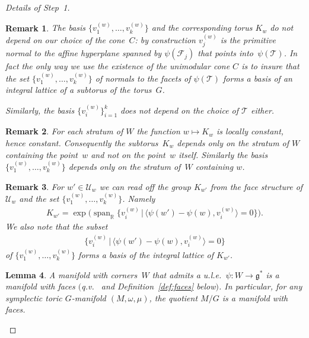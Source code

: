 \documentclass[10pt,a4paper]{amsart}
\numberwithin{equation}{section}
\newtheorem{Lemma}{Lemma}[section]
\newtheorem{Remark}[Lemma]{Remark}
\begin{document}
\begin{proof}[Details of Step~1]
\begin{Remark}
  The basis $\{v_1^{(w)},\ldots, v_k^{(w)}\}$
  and the corresponding torus $K_w$ do not depend on our choice of the
  cone~$C$:  by construction $v_j^{(w)}$ is the primitive
  normal to the af\/f\/ine hyperplane spanned by $\psi ({\mathcal F}_j)$ that
  points into~$\psi({\mathcal T})$.  In fact the only way we use the
  existence of the unimodular cone $C$ is to insure that the set
  $\{v_1^{(w)},\ldots, v_k^{(w)}\}$ of normals to the facets of
  $\psi({\mathcal T})$ forms a basis of an integral lattice of a subtorus of
  the torus~$G$.

  Similarly, the basis $\{v_i^{(w)}\}_{i=1}^k$ does not depend on the choice of
  ${\mathcal T}$ either.
\end{Remark}

\begin{Remark}
  For each stratum of $W$ the function $w\mapsto K_w$ is
  locally constant, hence constant.  Consequently the subtorus~$K_w$
  depends only on the stratum of $W$ containing the point~$w$ and
  not on the point~$w$ itself.  Similarly the basis
  $\{v_1^{(w)},\ldots, v_k^{(w)}\}$ depends only on the stratum of~$W$
  containing $w$.
\end{Remark}

\begin{Remark}\label{rmrk:2.21}
For $w'\in {\mathcal U}_w$ we can read of\/f the group $K_{w'}$ from the face structure
of ${\mathcal U}_w$ and the set $\{v_1^{(w)},\ldots, v_k^{(w)}\}$. Namely
\begin{gather*}
K_{w'} = \exp \big(\operatorname{span}_{\mathbb R} \big\{v_i^{(w)} \, | \,
   \big\langle \psi(w')-\psi(w), v_i^{(w)}\big\rangle  = 0\big\}\big).
\end{gather*}
We also note that the subset
\begin{gather*}
\big\{v_i^{(w)} \, | \,  \big\langle \psi(w')-\psi(w), v_i^{(w)} \big\rangle = 0\big\}
\end{gather*}
of $\{v_1^{(w)},\ldots, v_k^{(w)}\}$ forms a basis of the integral
lattice of $K_{w'}$.
\end{Remark}

\begin{Lemma}\label{lem:mflds-w-faces}
A manifold with corners~$W$ that admits a u.l.e.\ $\psi \colon W \to {\mathfrak g}^*$
is a manifold with faces
$($q.v.~{\rm \cite{Janich}} and Definition~{\rm \ref{def:faces}} below$)$.
In particular, for any symplectic toric $G$-manifold $(M,\omega,\mu)$,
the quotient $M/G$ is a manifold with faces.
\end{Lemma}



\end{proof}
\end{document}
